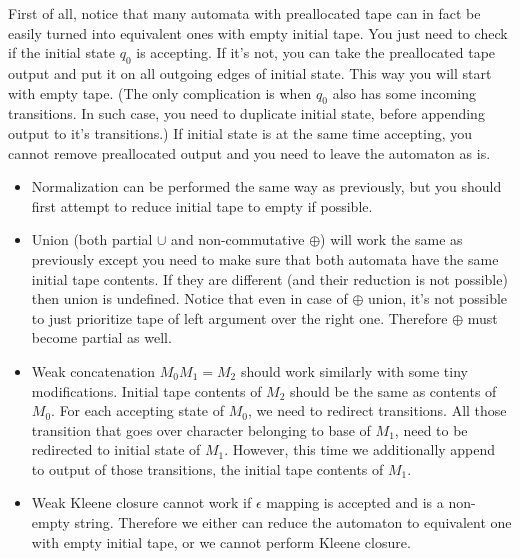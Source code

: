 \documentclass[12pt]{article}
\begin{document}
First of all, notice that many automata with preallocated tape can in fact be easily turned into equivalent ones with empty initial tape. You just need to check if the initial state  $q_0$ is accepting. If it's not, you can take the preallocated tape output and put it on all outgoing edges of initial state. This way you will start with empty tape. (The only complication is when $q_0 $ also has some incoming transitions. In such case, you need to duplicate initial state, before appending output to it's transitions.) If initial state is at the same time accepting, you cannot remove preallocated output and you need to leave the automaton as is. 
\begin{itemize}
	\item Normalization can be performed the same way as previously, but you should first attempt to reduce initial tape to empty if possible.
	\item Union (both partial $\cup$ and non-commutative $\oplus$) will work the same as previously except you need to make sure that both automata have the same initial tape contents. If they are different (and their reduction is not possible) then union is undefined. Notice that even in case of $\oplus$ union, it's not possible to just prioritize tape of left argument over the right one. Therefore $\oplus$ must become partial as well. 
	\item 
	Weak concatenation $M_0 M_1 = M_2$ should work similarly with some tiny modifications. Initial tape contents of $M_2$ should be the same as contents of $M_0$. For each accepting state of $M_0$, we need to redirect transitions. All those transition that goes over character belonging to base of $M_1$,  need to be redirected to initial state of $M_1$. However, this time we additionally append to output of those transitions, the initial tape contents of  $M_1$.
	\item Weak Kleene closure cannot work if $\epsilon$ mapping is accepted and is a non-empty string. Therefore we either can reduce the automaton to equivalent one with empty initial tape, or we cannot perform Kleene closure.
	
\end{itemize}
\end{document}
